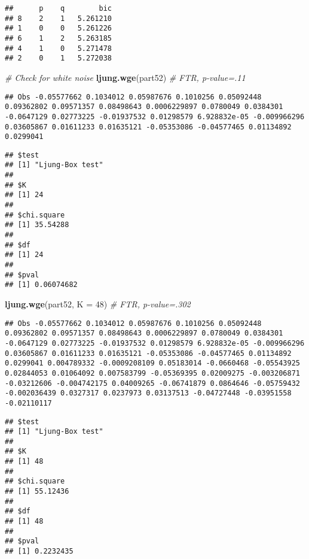 \documentclass[]{article}
\newenvironment{Shaded}{\begin{snugshade}}{\end{snugshade}}
\newcommand{\KeywordTok}[1]{\textcolor[rgb]{0.13,0.29,0.53}{\textbf{#1}}}
\newcommand{\DataTypeTok}[1]{\textcolor[rgb]{0.13,0.29,0.53}{#1}}
\newcommand{\DecValTok}[1]{\textcolor[rgb]{0.00,0.00,0.81}{#1}}
\newcommand{\CommentTok}[1]{\textcolor[rgb]{0.56,0.35,0.01}{\textit{#1}}}
\newcommand{\NormalTok}[1]{#1}
\begin{document}
\begin{verbatim}
##      p    q        bic
## 8    2    1   5.261210
## 1    0    0   5.261226
## 6    1    2   5.263185
## 4    1    0   5.271478
## 2    0    1   5.272038
\end{verbatim}

\begin{Shaded}
\begin{Highlighting}[]
\CommentTok{# Check for white noise}
\KeywordTok{ljung.wge}\NormalTok{(part52)                                   }\CommentTok{# FTR, p-value=.11}
\end{Highlighting}
\end{Shaded}

\begin{verbatim}
## Obs -0.05577662 0.1034012 0.05987676 0.1010256 0.05092448 0.09362802 0.09571357 0.08498643 0.0006229897 0.0780049 0.0384301 -0.0647129 0.02773225 -0.01937532 0.01298579 6.928832e-05 -0.009966296 0.03605867 0.01611233 0.01635121 -0.05353086 -0.04577465 0.01134892 0.0299041
\end{verbatim}

\begin{verbatim}
## $test
## [1] "Ljung-Box test"
## 
## $K
## [1] 24
## 
## $chi.square
## [1] 35.54288
## 
## $df
## [1] 24
## 
## $pval
## [1] 0.06074682
\end{verbatim}

\begin{Shaded}
\begin{Highlighting}[]
\KeywordTok{ljung.wge}\NormalTok{(part52, }\DataTypeTok{K =} \DecValTok{48}\NormalTok{)                           }\CommentTok{# FTR, p-value=.302}
\end{Highlighting}
\end{Shaded}

\begin{verbatim}
## Obs -0.05577662 0.1034012 0.05987676 0.1010256 0.05092448 0.09362802 0.09571357 0.08498643 0.0006229897 0.0780049 0.0384301 -0.0647129 0.02773225 -0.01937532 0.01298579 6.928832e-05 -0.009966296 0.03605867 0.01611233 0.01635121 -0.05353086 -0.04577465 0.01134892 0.0299041 0.004789332 -0.0009208109 0.05183014 -0.0660468 -0.05543925 0.02844053 0.01064092 0.007583799 -0.05369395 0.02009275 -0.003206871 -0.03212606 -0.004742175 0.04009265 -0.06741879 0.0864646 -0.05759432 -0.002036439 0.0327317 0.0237973 0.03137513 -0.04727448 -0.03951558 -0.02110117
\end{verbatim}

\begin{verbatim}
## $test
## [1] "Ljung-Box test"
## 
## $K
## [1] 48
## 
## $chi.square
## [1] 55.12436
## 
## $df
## [1] 48
## 
## $pval
## [1] 0.2232435
\end{verbatim}
\end{document}
